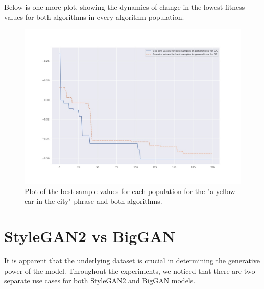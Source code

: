 \documentclass[12pt,a4paper,openany]{book}
\begin{document}
\noindent Below is one more plot, showing the dynamics of change in the lowest fitness values for both algorithms in every algorithm population.
\begin{figure}[H]
	\centering
    \includegraphics[scale=0.4]{figs/best_both.jpg}
    \caption{Plot of the best sample values for each population for the "a yellow car in the city" phrase and both algorithms.}\label{Fig:STYLEGAN}
\end{figure}

\section{StyleGAN2 vs BigGAN}

\noindent It is apparent that the underlying dataset is crucial in determining the generative power of the model. Throughout the experiments, we noticed that there are two separate use cases for both StyleGAN2 and BigGAN models. 
\end{document}
